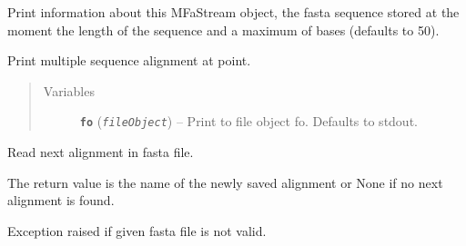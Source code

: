 \documentclass[letterpaper,10pt,english]{sphinxmanual}
\begin{document}
\begin{fulllineitems}
\begin{fulllineitems}
Print information about this MFaStream object, the fasta
sequence stored at the moment the length of the sequence and a
maximum of  bases (defaults to 50).

\end{fulllineitems}


\begin{fulllineitems}
\label{fasta:libPoMo.fasta.MFaStream.print_msa}
Print multiple sequence alignment at point.
\begin{quote}\begin{description}
\item[{Variables}] \leavevmode
\textbf{\texttt{fo}} (\emph{\texttt{fileObject}}) -- Print to file object fo. Defaults to
stdout.

\end{description}\end{quote}

\end{fulllineitems}


\begin{fulllineitems}
\label{fasta:libPoMo.fasta.MFaStream.read_next_align}
Read next alignment in fasta file.

The return value is the name of the newly saved alignment or
None if no next alignment is found.

\end{fulllineitems}


\end{fulllineitems}


\begin{fulllineitems}
\label{fasta:libPoMo.fasta.NotAFastaFileError}
Exception raised if given fasta file is not valid.

\end{fulllineitems}

\end{document}
